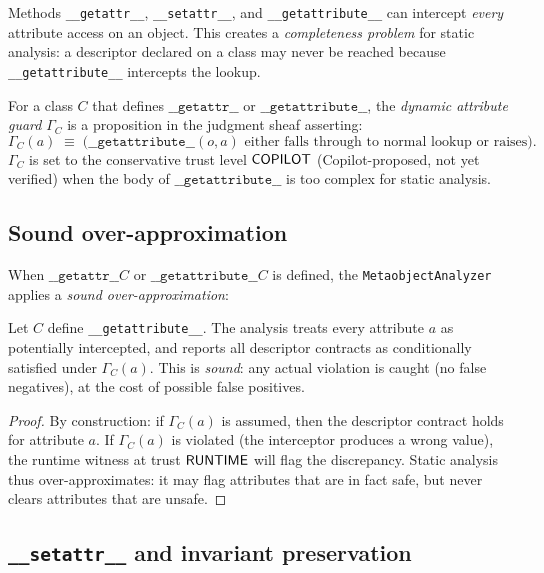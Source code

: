 \documentclass[11pt]{article}
\newcommand{\getattr}{\texttt{\_\_getattr\_\_}}
\newcommand{\setattr}{\texttt{\_\_setattr\_\_}}
\newcommand{\getattribute}{\texttt{\_\_getattribute\_\_}}
\newcommand{\DynGuard}[1]{\Gamma_{#1}}
\newcommand{\MetaAnalyzer}{\texttt{MetaobjectAnalyzer}}
\begin{document}
Methods \getattr, \setattr, and \getattribute{} can intercept
\emph{every} attribute access on an object.  This creates a
\emph{completeness problem} for static analysis: a descriptor declared
on a class may never be reached because \getattribute{} intercepts
the lookup.

\begin{definition}\label{def:dyn-guard}
  For a class $C$ that defines $\getattr$ or $\getattribute$, the
  \emph{dynamic attribute guard} $\DynGuard{C}$ is a proposition in
  the judgment sheaf asserting:
  \[
    \DynGuard{C}(a) \;\equiv\;
    \bigl(\texttt{\_\_getattribute\_\_}(o, a)
          \text{ either falls through to normal lookup or raises}\bigr).
  \]
  $\DynGuard{C}$ is set to the conservative trust level $\mathsf{COPILOT}$
  (Copilot-proposed, not yet verified) when the body of
  $\getattribute$ is too complex for static analysis.
\end{definition}

\subsection{Sound over-approximation}

When $\getattr{C}$ or $\getattribute{C}$ is defined, the
\MetaAnalyzer{} applies a \emph{sound over-approximation}:

\begin{proposition}\label{prop:over-approx}
  Let $C$ define \getattribute.  The \JuGeo{} analysis treats every
  attribute $a$ as potentially intercepted, and reports all descriptor
  contracts as conditionally satisfied under $\DynGuard{C}(a)$.
  This is \emph{sound}: any actual violation is caught (no false
  negatives), at the cost of possible false positives.
\end{proposition}

\begin{proof}
  By construction: if $\DynGuard{C}(a)$ is assumed, then the descriptor
  contract holds for attribute $a$.  If $\DynGuard{C}(a)$ is violated
  (the interceptor produces a wrong value), the runtime witness at trust
  $\mathsf{RUNTIME}$ will flag the discrepancy.  Static analysis thus
  over-approximates: it may flag attributes that are in fact safe, but
  never clears attributes that are unsafe.
\end{proof}

\subsection{\texttt{\_\_setattr\_\_} and invariant preservation}
\end{document}
